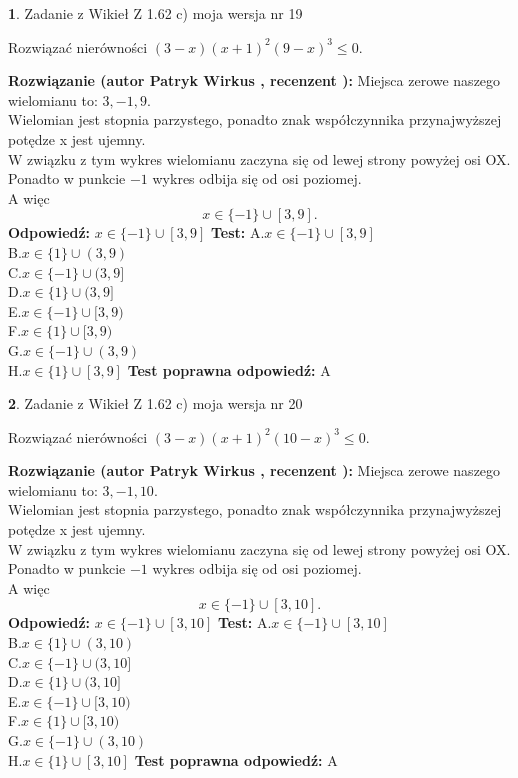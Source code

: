 \documentclass[12pt, a4paper]{article}
\theoremstyle{definition} %
\newtheorem{zad}{}
\newcommand{\zadStart}[1]{\begin{zad}#1\newline}
\newcommand{\zadStop}{\end{zad}}
\newcommand{\rozwStart}[2]{\noindent \textbf{Rozwiązanie (autor #1 , recenzent #2): }\newline}
\newcommand{\rozwStop}{\newline}
\newcommand{\odpStart}{\noindent \textbf{Odpowiedź:}\newline}
\newcommand{\odpStop}{\newline}
\newcommand{\testStart}{\noindent \textbf{Test:}\newline}
\newcommand{\testStop}{\newline}
\newcommand{\kluczStart}{\noindent \textbf{Test poprawna odpowiedź:}\newline}
\newcommand{\kluczStop}{\newline}
\begin{document}
\zadStart{Zadanie z Wikieł Z 1.62 c) moja wersja nr 19}

Rozwiązać nierówności $(3-x)(x+1)^{2}(9-x)^{3}\le0$.
\zadStop
\rozwStart{Patryk Wirkus}{}
Miejsca zerowe naszego wielomianu to: $3, -1, 9$.\\
Wielomian jest stopnia parzystego, ponadto znak współczynnika przy\linebreak najwyższej potędze x jest ujemny.\\ W związku z tym wykres wielomianu zaczyna się od lewej strony powyżej osi OX.\\
Ponadto w punkcie $-1$ wykres odbija się od osi poziomej.\\
A więc $$x \in \{-1\} \cup [3,9].$$
\rozwStop
\odpStart
$x \in \{-1\} \cup [3,9]$
\odpStop
\testStart
A.$x \in \{-1\} \cup [3,9]$\\
B.$x \in \{1\} \cup (3,9)$\\
C.$x \in \{-1\} \cup (3,9]$\\
D.$x \in \{1\} \cup (3,9]$\\
E.$x \in \{-1\} \cup [3,9)$\\
F.$x \in \{1\} \cup [3,9)$\\
G.$x \in \{-1\} \cup (3,9)$\\
H.$x \in \{1\} \cup [3,9]$
\testStop
\kluczStart
A
\kluczStop



\zadStart{Zadanie z Wikieł Z 1.62 c) moja wersja nr 20}

Rozwiązać nierówności $(3-x)(x+1)^{2}(10-x)^{3}\le0$.
\zadStop
\rozwStart{Patryk Wirkus}{}
Miejsca zerowe naszego wielomianu to: $3, -1, 10$.\\
Wielomian jest stopnia parzystego, ponadto znak współczynnika przy\linebreak najwyższej potędze x jest ujemny.\\ W związku z tym wykres wielomianu zaczyna się od lewej strony powyżej osi OX.\\
Ponadto w punkcie $-1$ wykres odbija się od osi poziomej.\\
A więc $$x \in \{-1\} \cup [3,10].$$
\rozwStop
\odpStart
$x \in \{-1\} \cup [3,10]$
\odpStop
\testStart
A.$x \in \{-1\} \cup [3,10]$\\
B.$x \in \{1\} \cup (3,10)$\\
C.$x \in \{-1\} \cup (3,10]$\\
D.$x \in \{1\} \cup (3,10]$\\
E.$x \in \{-1\} \cup [3,10)$\\
F.$x \in \{1\} \cup [3,10)$\\
G.$x \in \{-1\} \cup (3,10)$\\
H.$x \in \{1\} \cup [3,10]$
\testStop
\kluczStart
A
\kluczStop
\end{document}

